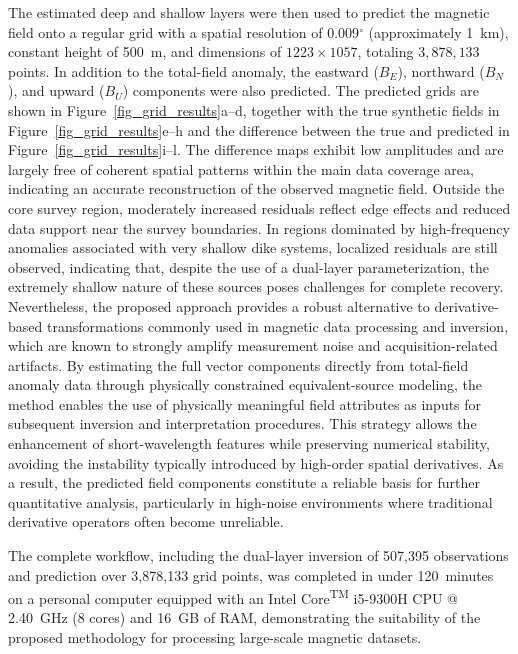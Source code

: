 \documentclass[onecolumn,10pt,a4paper]{article}
\begin{document}
The estimated deep and shallow layers were then used to predict the magnetic field
onto a regular grid with a spatial resolution of 0.009$^\circ$ (approximately
1~km), constant height of
500~m, and dimensions of $1223 \times 1057$, totaling $3,878,133$ points. In
addition to the total-field anomaly, the eastward ($B_E$), northward ($B_N$),
and upward ($B_U$) components were also predicted.
The predicted grids are shown in Figure~\ref{fig_grid_results}a--d, together
with the true synthetic fields in Figure~\ref{fig_grid_results}e--h and the
difference between the true and predicted in Figure~\ref{fig_grid_results}i--l.
The difference maps exhibit low amplitudes and are largely free of coherent
spatial patterns within the main data coverage area, indicating an accurate
reconstruction of the observed magnetic field. Outside the core survey
region, moderately increased residuals reflect edge effects and reduced data
support near the survey boundaries. In regions dominated by high-frequency
anomalies associated with very shallow dike systems, localized residuals are
still observed, indicating that, despite the use of a dual-layer
parameterization, the extremely shallow nature of these sources poses
challenges for complete recovery.
Nevertheless, the proposed approach provides a robust alternative to
derivative-based transformations commonly used in magnetic data processing
and inversion, which are known to strongly amplify measurement noise and
acquisition-related artifacts. By estimating the full vector components
directly from total-field anomaly data through physically constrained
equivalent-source modeling, the method enables the use of physically
meaningful field attributes as inputs for subsequent inversion and
interpretation procedures.
This strategy allows the enhancement of short-wavelength features while
preserving numerical stability, avoiding the instability typically
introduced by high-order spatial derivatives. As a result, the predicted
field components constitute a reliable basis for further quantitative
analysis, particularly in high-noise environments where traditional
derivative operators often become unreliable.

The complete workflow, including the dual-layer inversion of 507,395
observations and prediction over 3,878,133 grid points, was completed in under
120~minutes on a personal computer equipped with an
Intel\textsuperscript{\textregistered} Core\textsuperscript{TM} i5-9300H CPU @
2.40~GHz (8 cores) and 16~GB of RAM, demonstrating the suitability of the
proposed methodology for processing large-scale magnetic datasets.
\end{document}
